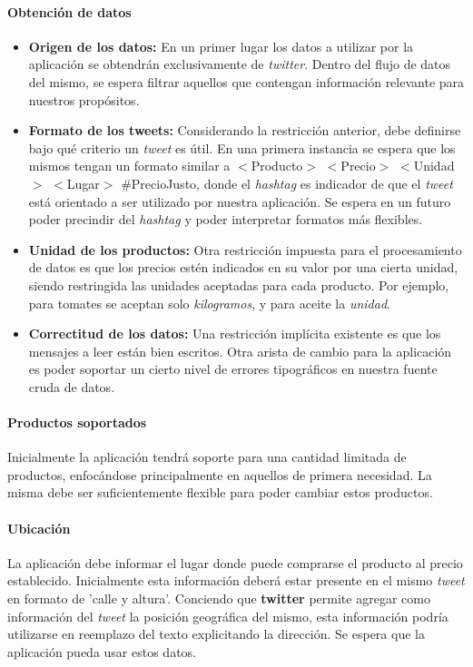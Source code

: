 \documentclass[10pt, a4paper]{article}
\begin{document}
\paragraph{Obtención de datos}
\begin{itemize}
    \item \textbf{Origen de los datos:} En un primer lugar los datos a utilizar por la aplicación se obtendrán exclusivamente de \emph{twitter}. Dentro del flujo de datos del mismo, se espera filtrar aquellos que contengan información relevante para nuestros propósitos.
    \item \textbf{Formato de los tweets:} Considerando la restricción anterior, debe definirse bajo qué criterio un \emph{tweet} es útil. En una primera instancia se espera que los mismos tengan un formato similar a \textsf{$<$Producto$>$ $<$Precio$>$ $<$Unidad$>$ $<$Lugar$>$ \#PrecioJusto}, donde el \emph{hashtag} es indicador de que el \emph{tweet} está orientado a ser utilizado por nuestra aplicación. Se espera en un futuro poder precindir del \emph{hashtag} y poder interpretar formatos más flexibles.
    \item \textbf{Unidad de los productos:} Otra restricción impuesta para el procesamiento de datos es que los precios estén indicados en su valor por una cierta unidad, siendo restringida las unidades aceptadas para cada producto. Por ejemplo, para tomates se aceptan solo \emph{kilogramos}, y para aceite la \emph{unidad}.
    \item \textbf{Correctitud de los datos:} Una restricción implícita existente es que los mensajes a leer están bien escritos. Otra arista de cambio para la aplicación es poder soportar un cierto nivel de errores tipográficos en nuestra fuente cruda de datos.
\end{itemize}

\paragraph{Productos soportados}
Inicialmente la aplicación tendrá soporte para una cantidad limitada de productos, enfocándose principalmente en aquellos de primera necesidad. La misma debe ser suficientemente flexible para poder cambiar estos productos. 

\paragraph{Ubicación}
La aplicación debe informar el lugar donde puede comprarse el producto al precio establecido. Inicialmente esta información deberá estar presente en el mismo \emph{tweet} en formato de 'calle y altura'. Conciendo que \textbf{twitter} permite agregar como información del \emph{tweet} la posición geográfica del mismo, esta información podría utilizarse en reemplazo del texto explicitando la dirección. Se espera que la aplicación pueda usar estos datos. 
\end{document}
